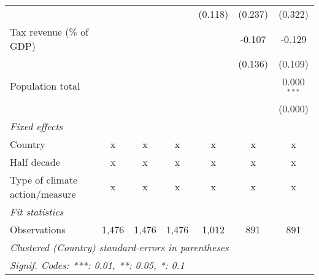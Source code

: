 \begin{tabular}{lcccccc}
                                                                 &         &         &              & (0.118)       & (0.237)       & (0.322)\\   
   Tax revenue (\% of GDP)                                       &         &         &              &               & -0.107        & -0.129\\   
                                                                 &         &         &              &               & (0.136)       & (0.109)\\   
   Population total                                              &         &         &              &               &               & 0.000$^{***}$\\   
                                                                 &         &         &              &               &               & (0.000)\\   
   \emph{Fixed effects}\\
   Country                                                       & x       & x       & x            & x             & x             & x\\  
   Half decade                                                   & x       & x       & x            & x             & x             & x\\  
   Type of climate action/measure                                & x       & x       & x            & x             & x             & x\\  
   \midrule \emph{Fit statistics}\\
   Observations                                                  & 1,476   & 1,476   & 1,476        & 1,012         & 891           & 891\\  
   \midrule
   \multicolumn{7}{l}{\emph{Clustered (Country) standard-errors in parentheses}}\\
   \multicolumn{7}{l}{\emph{Signif. Codes: ***: 0.01, **: 0.05, *: 0.1}}\\
\end{tabular}
\par\endgroup


